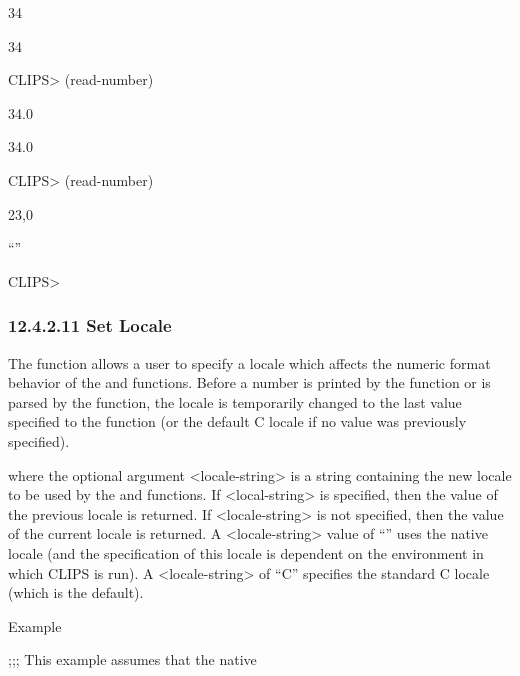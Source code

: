 \documentclass[letterpaper,10pt,english]{sphinxmanual}
\begin{document}
34

34

CLIPS\textgreater{} (read-number)

34.0

34.0

CLIPS\textgreater{} (read-number)

23,0

“”

CLIPS\textgreater{}


\subsubsection{12.4.2.11 Set Locale}
\label{\detokenize{actions:set-locale}}
The  function allows a user to specify a locale which
affects the numeric format behavior of the  and
 functions. Before a number is printed by the 
function or is parsed by the  function, the locale is
temporarily changed to the last value specified to the 
function (or the default C locale if no value was previously specified).


\begin{sphinxVerbatim}[commandchars=\\\{\}]
 \PYG{p}{[}\PYG{p}{]}
\end{sphinxVerbatim}

where the optional argument \textless{}locale-string\textgreater{} is a string containing the
new locale to be used by the  and  functions.
If \textless{}local-string\textgreater{} is specified, then the value of the previous locale is
returned. If \textless{}locale-string\textgreater{} is not specified, then the value of the
current locale is returned. A \textless{}locale-string\textgreater{} value of “” uses the
native locale (and the specification of this locale is dependent on the
environment in which CLIPS is run). A \textless{}locale-string\textgreater{} of “C” specifies
the standard C locale (which is the default).

Example

;;; This example assumes that the native
\end{document}
